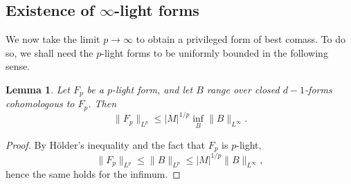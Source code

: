 \documentclass[reqno,11pt]{amsart}
\newcommand*\dif{\mathop{}\!\mathrm{d}}
\newtheorem{lemma}[theorem]{Lemma}
\theoremstyle{definition}
\numberwithin{equation}{section}
\newcommand\todo[1]{\textcolor{red}{TODO: #1}}
\begin{document}

\subsection{\texorpdfstring{Existence of $\infty$-light forms}{Existence of infinity-light forms}}
We now take the limit $p \to \infty$ to obtain a privileged form of best comass.
To do so, we shall need the $p$-light forms to be uniformly bounded in the following sense.

\begin{lemma}
Let $F_p$ be a $p$-light form, and let $B$ range over closed $d - 1$-forms cohomologous to $F_p$. Then
\begin{equation}\label{infinity magnetic rules p magnetic}
	\|F_p\|_{L^p} \leq |M|^{1/p} \inf_B \|B\|_{L^\infty}.
\end{equation}
\end{lemma}
\begin{proof}
By H\"older's inequality and the fact that $F_p$ is $p$-light,
$$\|F_p\|_{L^p} \leq \|B\|_{L^p} \leq |M|^{1/p} \|B\|_{L^\infty},$$
hence the same holds for the infimum.
\end{proof}
\end{document}
